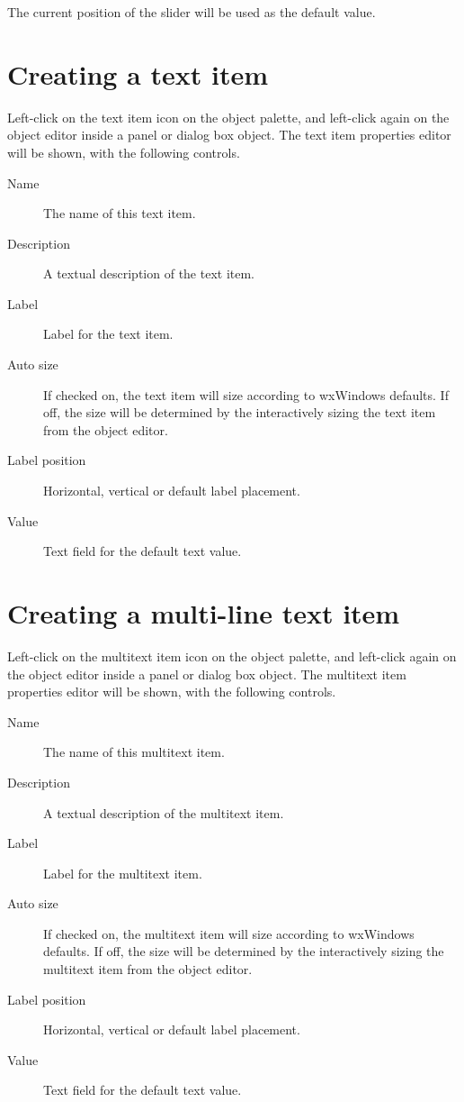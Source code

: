 The current position of the slider will be used as the default value.

\section{Creating a text item}

Left-click on the text item icon on the object palette, and left-click
again on the object editor inside a panel or dialog box object. The
text item properties editor will be shown, with the following
controls.

\begin{description}
\item[Name] The name of this text item.
\item[Description] A textual description of the text item.
\item[Label] Label for the text item.
\item[Auto size] If checked on, the text item will size according to
wxWindows defaults. If off, the size will be determined by the interactively sizing
the text item from the object editor.
\item[Label position] Horizontal, vertical or default label placement.
\item[Value] Text field for the default text value.
\end{description}

\section{Creating a multi-line text item}

Left-click on the multitext item icon on the object palette, and left-click
again on the object editor inside a panel or dialog box object. The
multitext item properties editor will be shown, with the following
controls.

\begin{description}
\item[Name] The name of this multitext item.
\item[Description] A textual description of the multitext item.
\item[Label] Label for the multitext item.
\item[Auto size] If checked on, the multitext item will size according to
wxWindows defaults. If off, the size will be determined by the interactively sizing
the multitext item from the object editor.
\item[Label position] Horizontal, vertical or default label placement.
\item[Value] Text field for the default text value.
\end{description}

